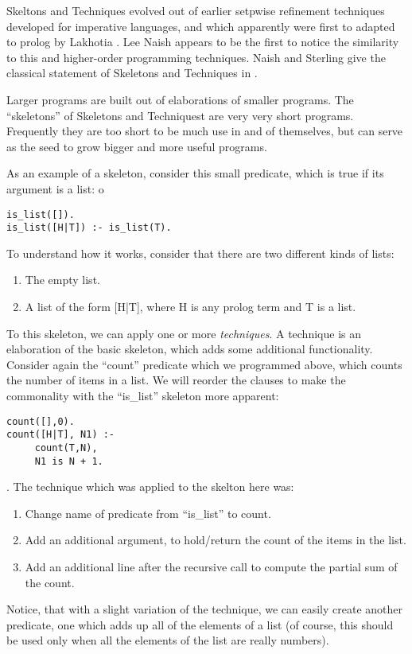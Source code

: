 \documentclass{book}[9pt]
\begin{document}
Skeltons and Techniques evolved out of earlier setpwise refinement
techniques developed for imperative languages, and which apparently
were first to adapted to prolog by Lakhotia \cite{lakhotia89}.  Lee
Naish \cite{naish96} appears to be the first to notice the similarity
to this and higher-order programming techniques.  Naish and Sterling
give the classical statement of Skeletons and Techniques in
\cite{naish2000}.

Larger programs are built out of elaborations of smaller programs.
The ``skeletons'' of Skeletons and Techniquest are very very short
programs.  Frequently they are too short to be much use in and of
themselves, but can serve as the seed to grow bigger and more useful
programs.

As an example of a skeleton, consider this small predicate, which is
true if its argument is a list:
o\begin{verbatim}
is_list([]).
is_list([H|T]) :- is_list(T).
\end{verbatim}
\noindent  To understand how it works, consider that there are two different
kinds of lists:
\begin{enumerate}
\item The empty list.
\item A list of the form [H|T], where H is any prolog term and T is a list.
\end{enumerate}

To this skeleton, we can apply one or more {\em techniques}.  A technique is an
elaboration of the basic skeleton, which adds some additional functionality. 
Consider again the ``count'' predicate which we programmed above, which counts
the number of items in a list.  We will reorder the clauses to make the
commonality with the ``is\_list'' skeleton more apparent:
\begin{verbatim}
count([],0).
count([H|T], N1) :-
     count(T,N),
     N1 is N + 1.
\end{verbatim}
\noindent.  The technique which was applied to the skelton here was:
\begin{enumerate}
\item Change name of predicate from ``is\_list'' to count.
\item Add an additional argument, to hold/return the count of the items in the list.
\item Add an additional line after the recursive call to compute the partial sum of the count.
\end{enumerate}

Notice, that with a slight variation of the technique, we can easily 
create another predicate, one which adds up all of the elements of a list
(of course, this should be used only when all the elements of the list
are really numbers).  
\end{document}
